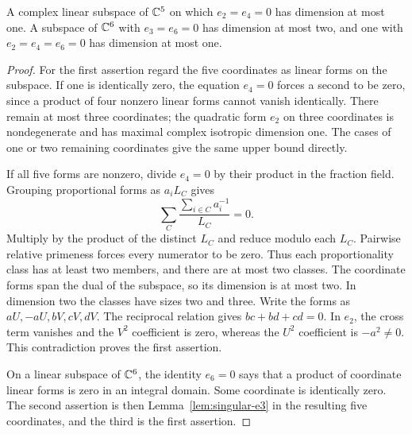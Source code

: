 \begin{lemma}\label{lem:evenelementary}
A complex linear subspace of $\mathbb C^5$ on which $e_2=e_4=0$ has dimension at most one. A subspace of $\mathbb C^6$ with $e_3=e_6=0$ has dimension at most two, and one with $e_2=e_4=e_6=0$ has dimension at most one.
\end{lemma}
\begin{proof}
For the first assertion regard the five coordinates as linear forms on the subspace. If one is identically zero, the equation $e_4=0$ forces a second to be zero, since a product of four nonzero linear forms cannot vanish identically. There remain at most three coordinates; the quadratic form $e_2$ on three coordinates is nondegenerate and has maximal complex isotropic dimension one. The cases of one or two remaining coordinates give the same upper bound directly.

If all five forms are nonzero, divide $e_4=0$ by their product in the fraction field. Grouping proportional forms as $a_iL_C$ gives
\[
 \sum_C\frac{\sum_{i\in C}a_i^{-1}}{L_C}=0.
\]
Multiply by the product of the distinct $L_C$ and reduce modulo each $L_C$. Pairwise relative primeness forces every numerator to be zero. Thus each proportionality class has at least two members, and there are at most two classes. The coordinate forms span the dual of the subspace, so its dimension is at most two. In dimension two the classes have sizes two and three. Write the forms as $aU,-aU,bV,cV,dV$. The reciprocal relation gives $bc+bd+cd=0$. In $e_2$, the cross term vanishes and the $V^2$ coefficient is zero, whereas the $U^2$ coefficient is $-a^2\ne0$. This contradiction proves the first assertion.

On a linear subspace of $\mathbb C^6$, the identity $e_6=0$ says that a product of coordinate linear forms is zero in an integral domain. Some coordinate is identically zero. The second assertion is then Lemma~\ref{lem:singular-e3} in the resulting five coordinates, and the third is the first assertion.
\end{proof}

